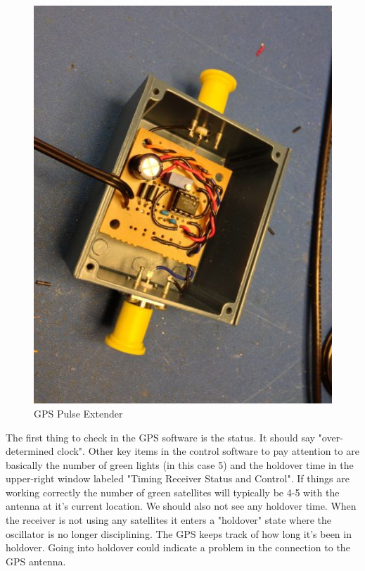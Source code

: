 \begin{figure}[htbp]
	\centering
		\includegraphics[width=15cm]{./figures/IMG_1345.jpg}
	\caption{{GPS Pulse Extender}}
	\label{fig:gps_pulse}
\end{figure}

The first thing to check in the GPS software is the status. It should say "over-determined clock". Other key items in the control software to pay attention to are basically the number of green lights (in this case 5) and the holdover time in the upper-right window labeled "Timing Receiver Status and Control". If things are working correctly the number of green satellites will typically be 4-5 with the antenna at it's current location. We should also not see any holdover time. When the receiver is not using any satellites it enters a "holdover" state where the oscillator is no longer disciplining. The GPS keeps track of how long it's been in holdover. Going into holdover could indicate a problem in the connection to the GPS antenna.


